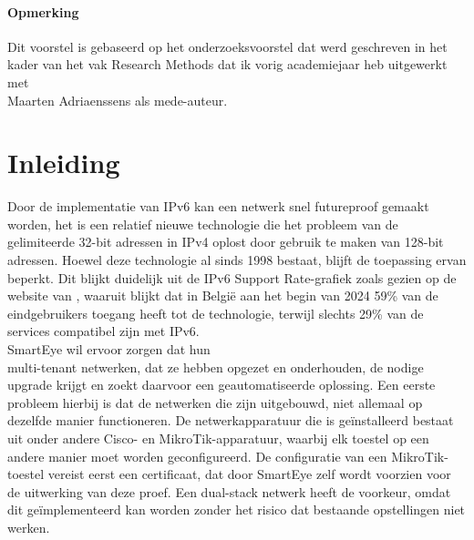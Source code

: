 

\paragraph{Opmerking}

Dit voorstel is gebaseerd op het onderzoeksvoorstel dat werd geschreven in het
kader van het vak Research Methods dat ik vorig academiejaar heb
uitgewerkt met \\ Maarten Adriaenssens als mede-auteur.


\section{Inleiding}%
\label{sec:inleiding}

Door de implementatie van IPv6 kan een netwerk snel futureproof gemaakt worden, het is een relatief nieuwe technologie die het probleem van de gelimiteerde 32-bit adressen in IPv4 oplost
door gebruik te maken van 128-bit adressen. Hoewel deze technologie al sinds 1998 bestaat, blijft de toepassing ervan beperkt. 
Dit blijkt duidelijk uit de IPv6 Support Rate-grafiek zoals gezien op de website van \textcite{EuropeanCommission}, 
waaruit blijkt dat in België aan het begin van 2024 59\% van de eindgebruikers toegang heeft tot de technologie, 
terwijl slechts 29\% van de services compatibel zijn met IPv6.\\

SmartEye wil ervoor zorgen dat hun \\ 
multi-tenant netwerken, dat ze hebben opgezet en onderhouden, de nodige upgrade krijgt en zoekt daarvoor een geautomatiseerde oplossing. 
Een eerste probleem hierbij is dat de netwerken die zijn uitgebouwd, 
niet allemaal op dezelfde manier functioneren. De netwerkapparatuur die is geïnstalleerd bestaat uit onder andere Cisco- en MikroTik-apparatuur, 
waarbij elk toestel op een andere manier moet worden geconfigureerd.  
De configuratie van een MikroTik-toestel vereist eerst een certificaat, dat door SmartEye zelf wordt voorzien voor de uitwerking van deze proef. 
Een dual-stack netwerk heeft de voorkeur, omdat dit geïmplementeerd kan worden zonder het risico dat bestaande opstellingen niet werken. 
\\

